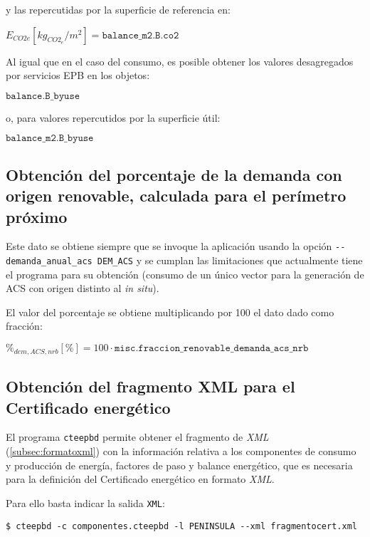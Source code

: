 \documentclass[10pt,notitlepage,oneside,a4paper]{article}
\begin{document}
y las repercutidas por la superficie de referencia en:

$E_{CO2e} [kg_{CO2_e}/m^2] = \texttt{balance\_m2.B.co2}$

Al igual que en el caso del consumo, es posible obtener los valores desagregados por servicios EPB en los objetos:

$\texttt{balance.B\_byuse}$

o, para valores repercutidos por la superficie útil:

$\texttt{balance\_m2.B\_byuse}$

\subsection{Obtención del porcentaje de la demanda con origen renovable, calculada para el perímetro próximo}

Este dato se obtiene siempre que se invoque la aplicación usando la opción \texttt{-{}-demanda\_anual\_acs DEM\_ACS} y se cumplan las limitaciones que actualmente tiene el programa para su obtención (consumo de un único vector para la generación de ACS con origen distinto al \textit{in situ}).

El valor del porcentaje se obtiene multiplicando por 100 el dato dado como fracción:

$\%_{dem,ACS,nrb} [\%] = 100 \cdot \texttt{misc.fraccion\_renovable\_demanda\_acs\_nrb}$


\subsection{Obtención del fragmento XML para el Certificado energético}

El programa \texttt{cteepbd} permite obtener el fragmento de \textit{XML} (\autoref{subsec:formatoxml}) con la información relativa a los componentes de consumo y producción de energía, factores de paso y balance energético, que es necesaria para la definición del Certificado energético en formato \textit{XML}.

Para ello basta indicar la salida \texttt{XML}:

\begin{Verbatim}[fontsize=\small]
    $ cteepbd -c componentes.cteepbd -l PENINSULA --xml fragmentocert.xml
\end{Verbatim}
\end{document}
